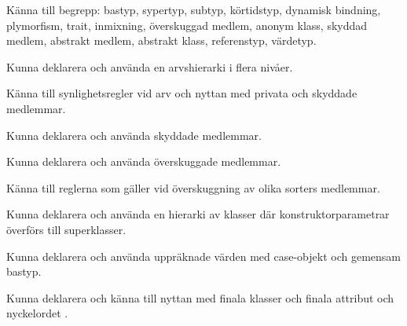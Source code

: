 

\item Känna till begrepp:
bastyp,
sypertyp,
subtyp,
körtidstyp,
dynamisk bindning,
plymorfism,
trait,
inmixning,
överskuggad medlem,
anonym klass,
skyddad medlem,
abstrakt medlem,
abstrakt klass,
referenstyp,
värdetyp.

\item Kunna deklarera och använda en arvshierarki i flera nivåer.

\item Känna till synlighetsregler vid arv och nyttan med privata och skyddade medlemmar.

\item Kunna deklarera och använda skyddade medlemmar.

\item Kunna deklarera och använda överskuggade medlemmar.

\item Känna till reglerna som gäller vid överskuggning av olika sorters medlemmar.

\item Kunna deklarera och använda en hierarki av klasser där konstruktorparametrar överförs till superklasser.

\item Kunna deklarera och använda uppräknade värden med case-objekt och gemensam bastyp.

\item Kunna deklarera och känna till nyttan med finala klasser och finala attribut och nyckelordet .





